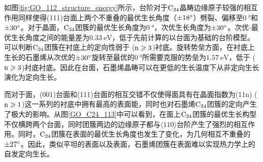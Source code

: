 如图\ref{fig:GO_112_structure_energy}所示，台阶对于$\rm{C_{24}}$晶畴边缘原子较强的相互作用同样使得(111)台面上两个不重叠的最优生长角度（$\SI{\pm 18 }{\degree}$）劈裂、偏移至$\SI{0}{\degree}$和$\SI{\pm 30 }{\degree}$。对于晶面，$\rm{C_{24}}$团簇的最优生长角度为$\SI{0}{\degree}$，次优生长角度为$\SI{\pm 30 }{\degree}$。次优-最优生长角度之间的能量差为$\SI{0.33}{\electronvolt}$，低于先前计算的以台面为基础的台阶模型。可以判断$\rm{C_{24}}$团簇在衬底上的定向性弱于 ($\rm{n \geqslant 3}$)衬底。旋转势垒方面，在衬底上生长的石墨烯从次优的$\SI{\pm 30 }{\degree}$旋转至最优的$\SI{0}{\degree}$所需要克服的势垒为$\SI{1.57 }{\electronvolt}$，低于 ($\rm{n \geqslant 3}$)衬底衬底。因此在台面，石墨烯晶畴可以在更低的生长温度下从非定向生长演化为定向生长。

而对于面，(001)台面和(111)台面的相互交错不仅使得面具有在晶面指数为(11n) ($\rm{n \geqslant 1}$)这一系列的衬底中拥有最高的表面能，同时也对石墨烯$\rm{C_{24}}$团簇的定向产生了极大的影响。从图\ref{GO_C24_113}中可以看到，在面上$\rm{C_{24}}$团簇的最优生长构型不仅横跨两个台面，同时团簇两边的边缘原子都与$\langle 110\rangle$台阶产生了强烈的相互作用。同时，$\rm{C_{24}}$团簇在表面的最优生长角度也发生了变化，为几何相互不重叠的$\SI{\pm 27 }{\degree}$。因此，类似平坦的表面以及表面，石墨烯团簇在表面难以实现热力学上的自发定向生长。

